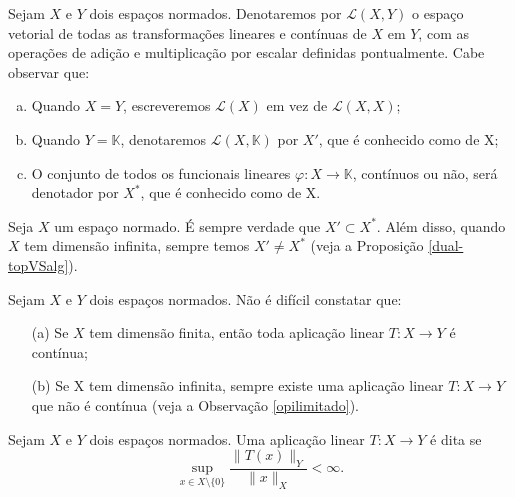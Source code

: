 \begin{definition}
    Sejam $X$ e $Y$ dois espaços normados. Denotaremos por $\mathcal L (X,Y)$ o espaço vetorial de todas as transformações lineares e contínuas de $X$ em $Y$, com as operações de adição e multiplicação por escalar definidas pontualmente. Cabe observar que:
    \begin{enumerate}[(a)]
    \item Quando $X=Y$, escreveremos $\mathcal L (X)$ em vez de $\mathcal L (X,X)$;
    \item Quando $Y=\mathbb K$, denotaremos $\mathcal L (X,\mathbb K)$ por $X'$, que é conhecido como   de X;
    \item O conjunto de todos os funcionais lineares $\varphi : X\longrightarrow \mathbb K$, contínuos ou não, será denotador por $X^{\ast}$, que é conhecido como   de X.
    \end{enumerate}
\end{definition}

\begin{remark}
Seja $X$ um espaço normado. É sempre verdade que $X' \subset X^{\ast}$. Além disso, quando $X$ tem dimensão infinita, sempre temos $X'\neq X^{\ast}$ (veja a Proposição \ref{dual-topVSalg}).
\end{remark}

\begin{remark}
Sejam $X$ e $Y$ dois espaços normados. Não é difícil constatar que:
\begin{itemize}
\item[(a)] Se $X$ tem dimensão finita, então toda aplicação linear $T:X\longrightarrow Y$ é contínua;
\item[(b)] Se X tem dimensão infinita, sempre existe uma aplicação linear $T:X\longrightarrow Y$ que não é contínua (veja a Observação \ref{opilimitado}).
\end{itemize}
\end{remark}

\begin{definition}\label{bounded}
Sejam $X$ e $Y$ dois espaços normados. Uma aplicação linear $T:X 
\longrightarrow Y$ é dita   
se 
\begin{equation}\label{ltdo}
\sup_{x\in X\setminus \{0\}} \frac{\|T(x)\|_Y}{\|x\|_X} 
<\infty.
\end{equation}

\end{definition}

